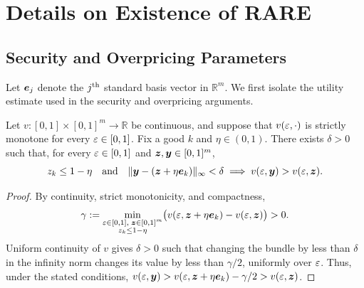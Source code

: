 \section{Details on Existence of RARE}
\label{sec:exist-extra}

\subsection{Security and Overpricing Parameters}
\label{sec:exist-extra:market-params}

Let $\bm{e}_j$ denote the $j^{\textrm{th}}$ standard basis vector in $\mathbb{R}^m$.
We first isolate the utility estimate used in the security and overpricing arguments.

\begin{lemma}
\label{thm:uniform-utility-improvement}
Let $v: [0, 1] \times [0, 1]^m \to \mathbb{R}$ be continuous, and suppose that
$v(\varepsilon, \cdot)$ is strictly monotone for every $\varepsilon \in [0, 1]$.
Fix a good $k$ and $\eta \in (0, 1)$.
There exists $\delta > 0$ such that, for every $\varepsilon \in [0, 1]$ and
$\bm{z}, \bm{y} \in [0, 1]^m$,
\[ z_k \le 1 - \eta \quad \text{and} \quad
    \lVert \bm{y} - (\bm{z} + \eta\bm{e}_k) \rVert_\infty < \delta
    \implies v(\varepsilon, \bm{y}) > v(\varepsilon, \bm{z}). \]
\end{lemma}
\begin{proof}
By continuity, strict monotonicity, and compactness,
\[ \gamma := \min_{\substack{\varepsilon \in [0, 1], \; \bm{z} \in [0, 1]^m \\ z_k \le 1 - \eta}}
    \bigl(v(\varepsilon, \bm{z} + \eta\bm{e}_k) - v(\varepsilon, \bm{z})\bigr) > 0. \]
Uniform continuity of $v$ gives $\delta > 0$ such that changing the bundle
by less than $\delta$ in the infinity norm changes its value by less than $\gamma/2$,
uniformly over $\varepsilon$.
Thus, under the stated conditions,
$v(\varepsilon, \bm{y}) > v(\varepsilon, \bm{z} + \eta\bm{e}_k) - \gamma/2 > v(\varepsilon, \bm{z})$.
\end{proof}

